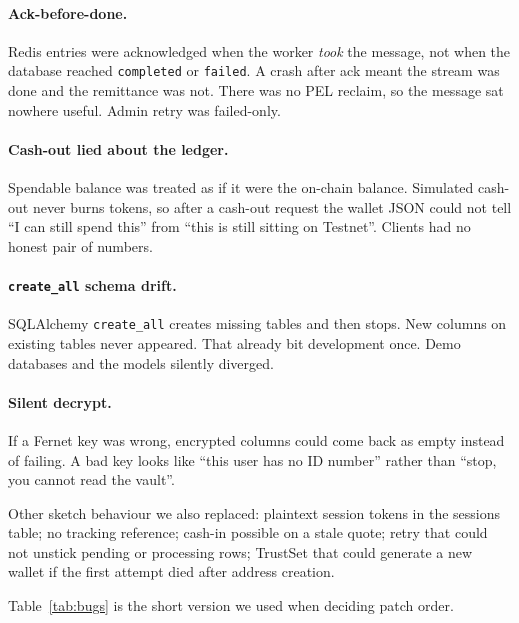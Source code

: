 \documentclass[11pt]{article}
\begin{document}
\paragraph{Ack-before-done.}
Redis entries were acknowledged when the worker \emph{took} the message, not when the database reached \texttt{completed} or \texttt{failed}. A crash after ack meant the stream was done and the remittance was not. There was no PEL reclaim, so the message sat nowhere useful. Admin retry was failed-only.

\paragraph{Cash-out lied about the ledger.}
Spendable balance was treated as if it were the on-chain balance. Simulated cash-out never burns tokens, so after a cash-out request the wallet JSON could not tell ``I can still spend this'' from ``this is still sitting on Testnet''. Clients had no honest pair of numbers.

\paragraph{\texttt{create\_all} schema drift.}
SQLAlchemy \texttt{create\_all} creates missing tables and then stops. New columns on existing tables never appeared. That already bit development once. Demo databases and the models silently diverged.

\paragraph{Silent decrypt.}
If a Fernet key was wrong, encrypted columns could come back as empty instead of failing. A bad key looks like ``this user has no ID number'' rather than ``stop, you cannot read the vault''.

Other sketch behaviour we also replaced: plaintext session tokens in the sessions table; no tracking reference; cash-in possible on a stale quote; retry that could not unstick pending or processing rows; TrustSet that could generate a new wallet if the first attempt died after address creation.

Table~\ref{tab:bugs} is the short version we used when deciding patch order.
\end{document}
